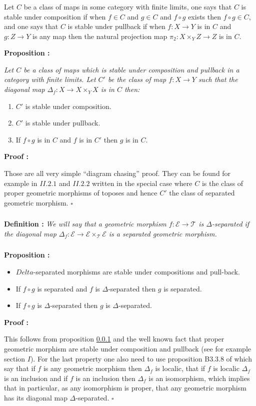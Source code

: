 \documentclass[a4paper]{article}
\newcommand{\Ecal}{\mathcal{E}}
\newcommand{\Tcal}{\mathcal{T}}
\newcommand{\block}[1]
{

\par \subsubsection{} #1

\bigskip}
\newcommand{\Prop}[1]
	{

	\bigskip
	
	\textbf{Proposition : }{\itshape #1}
		
	\bigskip
	
	}
\newcommand{\Def}[1]
	{
	
	\bigskip
	
	\textbf{Definition : }{\itshape #1}
	
	\bigskip
	
	}
\newcommand{\Dem}[1]{
	
	\smallskip
	
	\textbf{Proof : } \par
	 {#1} $\square$
	 
	 \bigskip
}
\begin{document}
\block{\label{stability_prop_C'}Let $C$ be a class of maps in some category with finite limits, one says that $C$ is stable under composition if when $f \in C$ and $g \in C$ and $f \circ g $ exists then $f \circ g \in C$, and one says that $C$ is stable under pullback if when $f :X \rightarrow Y$ is in $C$ and $g: Z \rightarrow Y$ is any map then the natural projection map $\pi_2: X \times_Y Z \rightarrow Z$ is in $C$.

\Prop{Let $C$ be a class of maps which is stable under composition and pullback in a category with finite limits. Let $C'$ be the class of map $f:X \rightarrow Y $ such that the diagonal map $\Delta_f :X \rightarrow X \times_Y X$ is in $C$ then:

\begin{enumerate}
\item $C'$ is stable under composition.
\item $C'$ is stable under pullback.
\item If $f \circ g$ is in $C$ and $f$ is in $C'$ then $g$ is in $C$.
\end{enumerate}
}

\Dem{Those are all very simple ``diagram chasing'' proof. They can be found for example in \cite{moerdijk2000proper} $II.2.1$ and $II.2.2$ written in the special case where $C$ is the class of proper geometric morphisms of toposes and hence $C'$ the class of separated geometric morphism.}
}


\block{\Def{We will say that a geometric morphism $f : \Ecal \rightarrow \Tcal$ is $\Delta$-separated if the diagonal map $\Delta_f : \Ecal \rightarrow \Ecal \times_{\Tcal} \Ecal$ is a separated geometric morphism.}}

\block{\label{Prop_Deltasep}\Prop{\begin{itemize}
\item $Delta$-separated morphisms are stable under compositions and pull-back.
\item If $f \circ g $ is separated and $f$ is $\Delta$-separated then $g$ is separated.
\item If $ f \circ g$ is $\Delta$-separated then $g$ is $\Delta$-separated.
\end{itemize}}

\Dem{This follows from proposition \ref{stability_prop_C'} and the well known fact that proper geometric morphism are stable under composition and pullback (see for example \cite{moerdijk2000proper} section $I$). For the last property one also need to use proposition B3.3.8 of \cite{sketches} which say that if $f$ is any geometric morphism then $\Delta_f$ is localic, that if $f$ is localic $\Delta_f$ is an inclusion and if $f$ is an inclusion then $\Delta_f$ is an isomorphism, which implies that in particular, as any isomorphism is proper, that any geometric morphism has its diagonal map $\Delta$-separated.}
}
\end{document}
